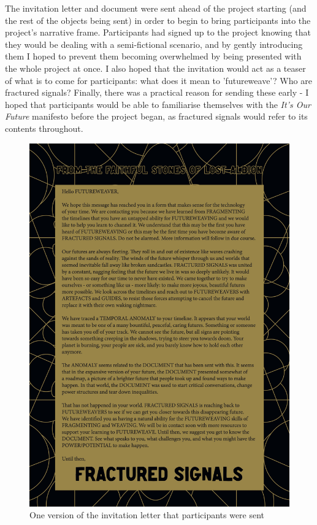 The invitation letter and document were sent ahead of the project starting (and the rest of the objects being sent) in order to begin to bring participants into the project's narrative frame. Participants had signed up to the project knowing that they would be dealing with a semi-fictional scenario, and by gently introducing them I hoped to prevent them becoming overwhelmed by being presented with the whole project at once. I also hoped that the invitation would act as a teaser of what is to come for participants: what does it mean to 'futureweave'? Who are fractured signals? Finally, there was a practical reason for sending these early - I hoped that participants would be able to familiarise themselves with the \emph{It's Our Future} manifesto before the project began, as fractured signals would refer to its contents throughout. 
\begin{figure}
    \centering
    \includegraphics[width=1\linewidth]{Images/8/fs-letter.jpg}
    \caption{One version of the invitation letter that participants were sent}
    \label{fig:fs-invitation}
\end{figure}

